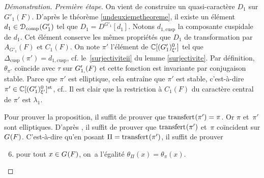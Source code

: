\documentclass[11pt]{article}
\newcommand{\cf}{cf.\xspace}
\numberwithin{equation}{section}\providecommand{\og}{«\,}\providecommand{\fg}{\,»}
\let\mathcal \EuScript
\newcommand{\NoChangel}[1]{%
\expandafter\let\csname old\string#1\endcsname=#1
\let#1=\relax
\newcommand{#1}{\mathcode`l="716C\csname old\string#1\endcsname\mathcode`l="7160 }%
}
\newcommand{\comp}{\mathrm{comp}}
\newcommand{\cusp}{\mathrm{cusp}}
\newcommand{\rell}{\mathrm{ell}} \NoChangel{\rell}
\newcommand{\Ell}{\mathrm{Ell}} \NoChangel{\Ell}
\newcommand{\st}{\mathrm{st}}
\DeclareMathOperator{\transfert}{transfert}
\newcommand{\cD}{\mathcal{D}}
\newcommand{\CC}{\mathbb{C}}
\theoremstyle{plain}
\theoremstyle{definition}
\renewcommand{\proofname}{Démonstration}
\begin{document}
\begin{proof}[\proofname. Première étape]
On vient de construire un quasi-caractère $D_{1}$ sur $G'_{1}(F)$. D'après le théorème \ref{undeuxiemetheoreme}, il existe un élément $d_{1}\in \cD_{\comp}(G'_{1})$ tel que $D_{1}=D^{G'_{1}}[d_{1}]$. Notons $d_{1,\cusp}$ la composante cuspidale de $d_{1}$. Cet élément conserve les mêmes propriétés que $D_{1}$ de transformation par $A_{G'_{1}}(F)$ et $C_{1}(F)$. On note $\pi'$ l'élément de $\CC[\Ell(G'_{1})_{\xi'}^0]$ tel que $\Delta_{\cusp}(\pi')=d_{1,\cusp}$, \cf le~\eqref{surjectiviteii} du lemme \ref{surjectivite}. Par définition, $\theta_{\pi'}$ coïncide avec $\tau$ sur $G'_{1,\rell}(F)$ et cette fonction est invariante par conjugaison stable. Parce que $\pi'$ est elliptique, cela entraîne que $\pi'$ est stable, c'est-à-dire $\pi'\in \CC[\Ell(G'_{1})_{\xi'}^0]^{\st}$, \cf \cite[Th.\,6.1]{A3}.
Il est clair que la restriction à $C_{1}(F)$ du caractère central de $\pi'$ est $\lambda_{1}$.

Pour prouver la proposition, il suffit de prouver que $\transfert_{\rell}(\pi')=\pi$. Or $\pi$ et~$\pi'$ sont elliptiques. D'après \cite[Th.\,6.2]{A3}, il suffit de prouver que $\transfert_{\rell}(\pi')$ et~$\pi$ coïncident sur $G_{\rell}(F)$. C'est-à-dire qu'en posant $\Pi=\transfert_{\rell}(\pi')$,
il suffit de prouver
\begin{enumerate}\setcounter{enumi}{5}
\item\label{unereciproque6}
pour tout $x\in G_{\rell}(F)$, on~a l'égalité $\theta_{\Pi}(x)=\theta_{\pi}(x)$.
\end{enumerate}


\end{proof}
\end{document}
